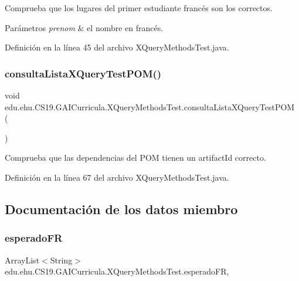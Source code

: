 Comprueba que los lugares del primer estudiante francés son los correctos. 


\begin{DoxyParams}{Parámetros}
{\em prenom} & el nombre en francés. \\
\hline
\end{DoxyParams}


Definición en la línea 45 del archivo X\+Query\+Methods\+Test.\+java.

\mbox{\label{a00036_a424440e0527b515a698294d6859d258a}} 
\subsubsection{\texorpdfstring{consultaListaXQueryTestPOM()}{consultaListaXQueryTestPOM()}}
{\footnotesize\ttfamily void edu.\+ehu.\+C\+S19.\+G\+A\+I\+Curricula.\+X\+Query\+Methods\+Test.\+consulta\+Lista\+X\+Query\+Test\+P\+OM (\begin{DoxyParamCaption}{ }\end{DoxyParamCaption})\hspace{0.3cm}{\ttfamily [package]}}



Comprueba que las dependencias del P\+OM tienen un artifact\+Id correcto. 



Definición en la línea 67 del archivo X\+Query\+Methods\+Test.\+java.



\subsection{Documentación de los datos miembro}
\mbox{\label{a00036_aee6b73a3384d4b23a34648334a099b97}} 
\subsubsection{\texorpdfstring{esperadoFR}{esperadoFR}}
{\footnotesize\ttfamily Array\+List$<$String$>$ edu.\+ehu.\+C\+S19.\+G\+A\+I\+Curricula.\+X\+Query\+Methods\+Test.\+esperado\+FR\hspace{0.3cm}{\ttfamily [static]}, {\ttfamily [package]}}



